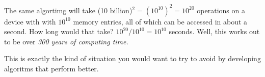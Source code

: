 \documentclass{tufte-handout}
\begin{document}
\bigskip
The same algortimg will take (10 billion)$^{2} = (10^{10})^2 = 10^{20}$ operations on a device with with 
$10^{10}$ memory entries, all of which can be accessed in about a second. How long would that take? 
$10^{20} / 10^{10} = 10^{10}$ seconds. Well, this works out to be over \emph{300 years of computing time.} 




This is exactly the kind of situation you would want to try to avoid by developing algoritms that perform better. 
\end{document}
